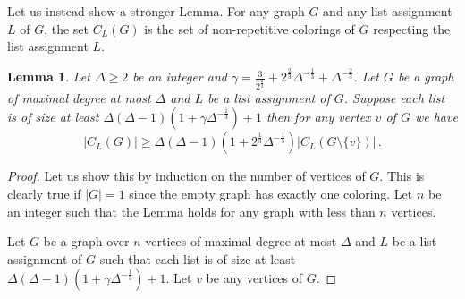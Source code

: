 \documentclass[a4paper,10pt]{article}
\newtheorem{lemma}[theorem]{Lemma}
\begin{document}
Let us instead show a stronger Lemma.
For any graph $G$ and any list assignment $L$ of $G$, the set $C_L(G)$ is the set of non-repetitive colorings of $G$ respecting the list assignment $L$.
\begin{lemma}
Let $\Delta\ge 2$ be an integer and $\gamma=\frac{3}{2^{\frac{2}{3}}}+2^{\frac{2}{3}}\Delta^{-\frac{1}{3}}+\Delta^{-\frac{2}{3}}$.
Let $G$ be a graph of maximal degree at most $\Delta$ and $L$ be a list assignment of $G$.
Suppose each list is of size at least $\Delta(\Delta-1)(1+ \gamma\Delta^{-\frac{1}{3}})+1$
then for any vertex $v$ of $G$ we have
 $$|C_L(G)|\ge \Delta(\Delta-1)(1+2^{\frac{1}{3}}\Delta^{-\frac{1}{3}}) |C_L(G\setminus\{v\})|\,.$$
\end{lemma}
\begin{proof}
 Let us show this by induction on the number of vertices of $G$.
 This is clearly true if $|G|=1$ since the empty graph has exactly one coloring.
 Let $n$ be an integer such that the Lemma holds for any graph with less than $n$ vertices.
 
 Let $G$ be a graph over $n$ vertices of maximal degree at most $\Delta$ and
 $L$ be a list assignment of $G$ such that each list is of size at least $\Delta(\Delta-1)(1+ \gamma\Delta^{-\frac{1}{3}})+1$.
 Let $v$ be any vertices of $G$.
 

\end{proof}
\end{document}
